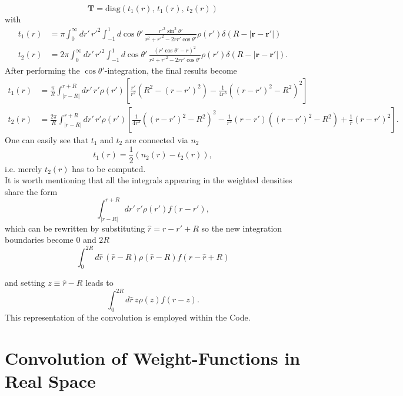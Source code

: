 \documentclass{article}
\begin{document}
\begin{equation}
	\mathbf{T} = \text{diag}(t_1(r),\,t_1(r),\,t_2(r))
\end{equation}
with
\begin{align}
	t_1(r) &= \pi\int_0^\infty dr'\,r'^2\int_{-1}^1d\cos\theta'\,\frac{r'^2\sin^2\theta'}{r^2+r'^2-2rr'\cos\theta'}\rho(r')\delta(R-|\mathbf{r}-\mathbf{r}'|)\\\nonumber
	t_2(r) &= 2\pi\int_0^\infty dr'\,r'^2\int_{-1}^1d\cos\theta'\,\frac{(r'\cos\theta'-r)^2}{r^2+r'^2-2rr'\cos\theta'}\rho(r')\delta(R-|\mathbf{r}-\mathbf{r}'|).
\end{align}
After performing the $\cos\theta'$-integration, the final results become
\begin{align}
	t_1(r) &= \frac{\pi}{R}\int_{|r-R|}^{r+R} dr'\,r'\rho(r')\left[\frac{r'}{r^2}\left(R^2-(r-r')^2\right)-\frac{1}{4r^3}\left((r-r')^2-R^2\right)^2\right]\\\nonumber
	t_2(r) &= \frac{2\pi}{R}\int_{|r-R|}^{r+R} dr'\,r'\rho(r')\left[\frac{1}{4r^3}\left((r-r')^2-R^2\right)^2-\frac{1}{r^2}(r-r')\left((r-r')^2-R^2\right)+\frac{1}{r}(r-r')^2\right].
\end{align}
One can easily see that $t_1$ and $t_2$ are connected via $n_2$
\begin{equation}
	t_1(r) = \frac{1}{2}(n_2(r)-t_2(r)),
\end{equation}
i.e. merely $t_2(r)$ has to be computed.\\
It is worth mentioning that all the integrals appearing in the weighted densities share the form
\begin{equation}
	\int_{|r-R|}^{r+R}dr'\,r'\rho(r')f(r-r'),
\end{equation}
which can be rewritten by substituting $\hat{r} = r-r'+R$ so the new integration boundaries become 0 and $2R$
\begin{equation}
	\int_0^{2R} d\hat{r}\,(\hat{r}-R)\rho(\hat{r}-R)f(r-\hat{r}+R)
\end{equation}

and setting $z\equiv \hat{r}-R$ leads to
\begin{equation}
	\int_0^{2R} d\hat{r}\,z\rho(z)f(r-z).
\end{equation}
This representation of the convolution is employed within the Code. 


\section{Convolution of Weight-Functions in Real Space}
\end{document}
